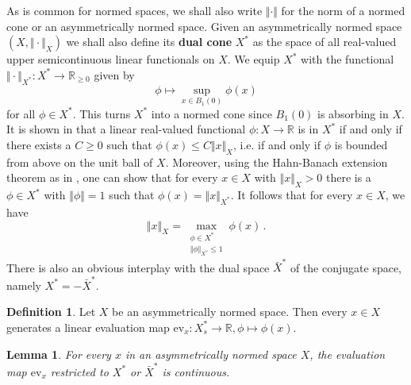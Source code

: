 \documentclass[
	paper=A4,
	pagesize=auto,
	fontsize=12pt
]{scrartcl}
\theoremstyle{plain}
\newtheorem{lemma}[theorem]{Lemma}
\theoremstyle{remark}
\theoremstyle{definition}
\newtheorem{definition}[theorem]{Definition}
\begin{document}
As is common for normed spaces, we shall also write $\Vert \cdot \Vert$ for the norm of a normed cone or an asymmetrically normed space.
Given an asymmetrically normed space $(X, \Vert \cdot \Vert_X)$ we shall also define its \textbf{dual cone} $X^*$ as the space of all real-valued upper semicontinuous linear functionals on $X$.
We equip $X^*$ with the functional $\Vert \cdot \Vert_{X^*} : X^* \to \mathbb{R}_{\ge 0}$ given by
%
\begin{equation}
\phi \mapsto \sup_{x \in B_1(0)} \phi \left( x \right)
\end{equation}
%
for all $\phi \in X^*$.
This turns $X^*$ into a normed cone since $B_1(0)$ is absorbing in $X$.
It is shown in \cite{src:Cobzaş:FunctionalAnalysisinAsymmetricNormedSpaces} that a linear real-valued functional $\phi : X \to \mathbb{R}$ is in $X^*$ if and only if there exists a $C \ge 0$ such that $\phi(x) \le C \Vert x \Vert_X$, i.e. if and only if $\phi$ is bounded from above on the unit ball of $X$.
Moreover, using the Hahn-Banach extension theorem as in \cite[Theorem 2.2.2]{src:Cobzaş:FunctionalAnalysisinAsymmetricNormedSpaces}, one can show that for every $x \in X$ with $\Vert x \Vert_X > 0$ there is a $\phi \in X^*$ with $\Vert \phi \Vert = 1$ such that $\phi(x) = \Vert x \Vert_{X^*}$.
It follows that for every $x \in X$, we have
%
\begin{equation}
\label{eq:NormByDualFunctionalsIsAttained}
\left\Vert x \right\Vert_X = \max_{\substack{\phi \in X^*\\ \Vert \phi \Vert_{X^*} \le 1}} \phi \left( x \right) \, .
\end{equation}
%
There is also an obvious interplay with the dual space $\bar{X}^*$ of the conjugate space, namely $X^* = - \bar{X}^*$.
%
\begin{definition}
Let $X$ be an asymmetrically normed space.
Then every $x \in X$ generates a linear evaluation map $\mathrm{ev}_x : X_s^* \to \mathbb{R}, \phi \mapsto \phi(x)$.
\end{definition}
%
\begin{lemma}
\label{lem:EvaluationMap}
For every $x$ in an asymmetrically normed space $X$, the evaluation map $\mathrm{ev}_x$ restricted to $X^*$ or $\bar{X}^*$ is continuous.
\end{lemma}
\end{document}
